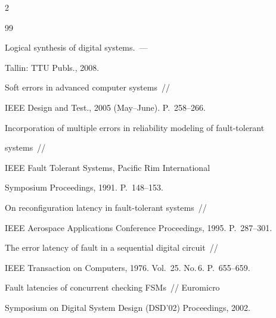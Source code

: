 \begin{multicols}{2}
{{\begin{thebibliography}{99}




Logical synthesis of digital systems.~---


Tallin: TTU Publs., 2008.









Soft errors in advanced computer systems~//


IEEE Design and Test., 2005 (May--June). P.~258--266.









Incorporation of multiple errors in reliability modeling of fault-tolerant


systems~//


IEEE Fault Tolerant Systems, Pacific Rim International


Symposium Proceedings, 1991. P.~148--153.









On reconfiguration latency in fault-tolerant systems~//


IEEE Aerospace Applications Conference Proceedings, 1995. P.~287--301.












The error latency of fault in a sequential digital circuit~//


IEEE Transaction on Computers, 1976. Vol.~25. No.\,6. P.~655--659.









Fault latencies of concurrent checking FSMs~// Euromicro


Symposium on Digital System Design (DSD'02) Proceedings, 2002.






\end{thebibliography}}}
\end{multicols}

